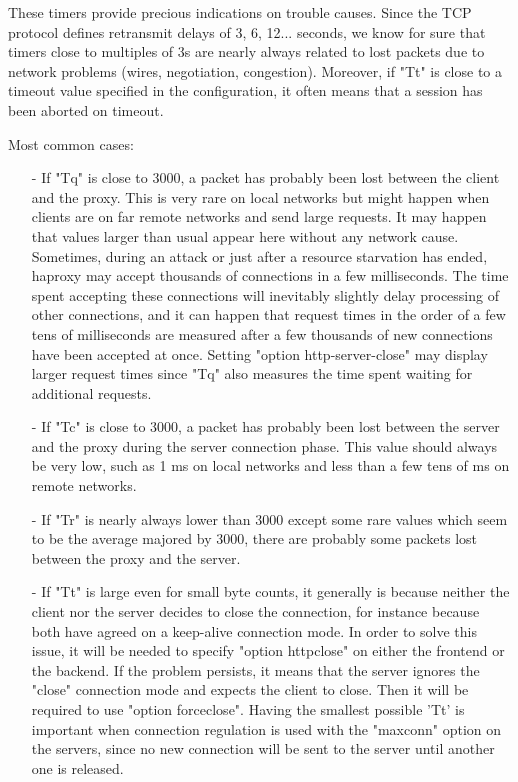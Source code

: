These timers provide precious indications on trouble causes. Since the TCP
protocol defines retransmit delays of 3, 6, 12... seconds, we know for sure
that timers close to multiples of 3s are nearly always related to lost packets
due to network problems (wires, negotiation, congestion). Moreover, if "Tt" is
close to a timeout value specified in the configuration, it often means that a
session has been aborted on timeout.

Most common cases:

\begin{itemize}
\item[-]
    If "Tq" is close to 3000, a packet has probably been lost between the
    client and the proxy. This is very rare on local networks but might happen
    when clients are on far remote networks and send large requests. It may
    happen that values larger than usual appear here without any network cause.
    Sometimes, during an attack or just after a resource starvation has ended,
    haproxy may accept thousands of connections in a few milliseconds. The time
    spent accepting these connections will inevitably slightly delay processing
    of other connections, and it can happen that request times in the order of
    a few tens of milliseconds are measured after a few thousands of new
    connections have been accepted at once. Setting "option http-server-close"
    may display larger request times since "Tq" also measures the time spent
    waiting for additional requests.
\item[-]
    If "Tc" is close to 3000, a packet has probably been lost between the
    server and the proxy during the server connection phase. This value should
    always be very low, such as 1 ms on local networks and less than a few tens
    of ms on remote networks.
\item[-]
    If "Tr" is nearly always lower than 3000 except some rare values which seem
    to be the average majored by 3000, there are probably some packets lost
    between the proxy and the server.
\item[-]
    If "Tt" is large even for small byte counts, it generally is because
    neither the client nor the server decides to close the connection, for
    instance because both have agreed on a keep-alive connection mode. In order
    to solve this issue, it will be needed to specify "option httpclose" on
    either the frontend or the backend. If the problem persists, it means that
    the server ignores the "close" connection mode and expects the client to
    close. Then it will be required to use "option forceclose". Having the
    smallest possible 'Tt' is important when connection regulation is used with
    the "maxconn" option on the servers, since no new connection will be sent
    to the server until another one is released.
\end{itemize}

